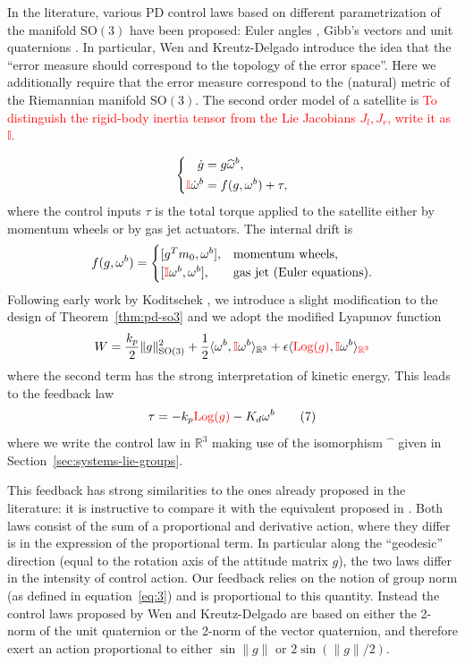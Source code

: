 \documentclass[10pt,twocolumn]{article}
\newcommand{\rev}[1]{\textcolor{red}{#1}}
\newcommand{\Log}{\operatorname{Log}}
\newcommand{\SO}{\mathrm{SO}}
\newcommand{\R}{\mathbb R}
\begin{document}
In the literature, various PD control laws based on different parametrization of the manifold $\SO(3)$ have been proposed: Euler angles \cite{11}, Gibb's vectors \cite{12} and unit quaternions \cite{13}. In particular, Wen and Kreutz-Delgado \cite{13} introduce the idea that the ``error measure should correspond to the topology of the error space''. Here we additionally require that the error measure correspond to the (natural) metric of the Riemannian manifold $\SO(3)$. The second order model of a satellite is
\rev{To distinguish the rigid-body inertia tensor from the Lie Jacobians $J_l,J_r$, write it as $\mathbb I$.}\par
\begin{equation*}
\left\{\begin{aligned}
\dot g&=g\widehat\omega^b,\\
\rev{\mathbb I}\dot\omega^b&=f(g,\omega^b)+\tau,
\end{aligned}\right.
\end{equation*}
where the control inputs $\tau$ is the total torque applied to the satellite either by momentum wheels or by gas jet actuators. The internal drift is
\begin{equation*}
f(g,\omega^b)=
\begin{cases}
[g^Tm_0,\omega^b],&\text{momentum wheels},\\
[\rev{\mathbb I}\omega^b,\omega^b],&\text{gas jet (Euler equations)}.
\end{cases}
\end{equation*}
Following early work by Koditschek \cite{14}, we introduce a slight modification to the design of Theorem~\ref{thm:pd-so3} and we adopt the modified Lyapunov function
\begin{equation*}
W=\frac{k_p}{2}\|g\|_{\SO(3)}^2+\frac12\langle\omega^b,\rev{\mathbb I}\omega^b\rangle_{\R^3}
+\epsilon\langle\rev{\Log(g)},\rev{\mathbb I}\omega^b\rangle_{\rev{\R^3}}
\end{equation*}
where the second term has the strong interpretation of kinetic energy. This leads to the feedback law
\begin{equation*}
\tau=-k_p\rev{\Log(g)}-K_d\omega^b\tag{7}\label{eq:7}
\end{equation*}
where we write the control law in $\R^3$ making use of the isomorphism $\widehat{\phantom{x}}$ given in Section~\ref{sec:systems-lie-groups}.

This feedback has strong similarities to the ones already proposed in the literature: it is instructive to compare it with the equivalent proposed in \cite{13}. Both laws consist of the sum of a proportional and derivative action, where they differ is in the expression of the proportional term. In particular along the ``geodesic'' direction (equal to the rotation axis of the attitude matrix $g$), the two laws differ in the intensity of control action. Our feedback relies on the notion of group norm (as defined in equation~\eqref{eq:3}) and is proportional to this quantity. Instead the control laws proposed by Wen and Kreutz-Delgado are based on either the 2-norm of the unit quaternion or the 2-norm of the vector quaternion, and therefore exert an action proportional to either $\sin\|g\|$ or $2\sin(\|g\|/2)$.
\end{document}
